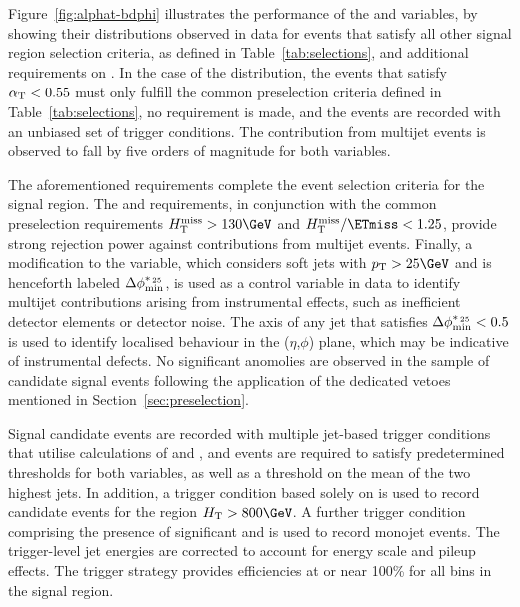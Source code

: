 Figure~\ref{fig:alphat-bdphi} illustrates the performance of the
\alphat and \bdphi variables, by showing their distributions observed
in data for events that satisfy all other signal region selection
criteria, as defined in Table~\ref{tab:selections}, and additional
requirements on \scalht. In the case of the \alphat distribution, the
events that satisfy $\alpha_{\text{T}} < 0.55$ must only fulfill the common
preselection criteria defined in Table~\ref{tab:selections}, no
\HTmiss requirement is made, and the events are recorded with an
unbiased set of trigger \scalht conditions. The contribution from
multijet events is observed to fall by five orders of magnitude for
both variables.

The aforementioned requirements complete the event selection criteria
for the signal region. The \alphat and \bdphi requirements, in
conjunction with the common preselection requirements $\HTmiss >
130\GeV$ and $\HTmiss / \ETmiss < 1.25$, provide strong rejection
power against contributions from multijet events. Finally, a
modification to the \bdphi variable, which considers soft jets with
$\Pt > 25\GeV$ and is henceforth labeled $\mbox{$\Delta\phi^{*_{\, 25}}_{\rm min}$}$, is used as a
control variable in data to identify multijet contributions arising
from instrumental effects, such as inefficient detector elements or
detector noise. The axis of any jet that satisfies $\mbox{$\Delta\phi^{*_{\, 25}}_{\rm min}$} < 0.5$
is used to identify localised behaviour in the ($\eta$,$\phi$) plane,
which may be indicative of instrumental defects. No significant
anomolies are observed in the sample of candidate signal events
following the application of the dedicated vetoes mentioned in
Section~\ref{sec:preselection}.

Signal candidate events are recorded with multiple jet-based trigger
conditions that utilise calculations of \scalht and \alphat, and
events are required to satisfy predetermined thresholds for both
variables, as well as a threshold on the mean \Pt of the two highest
\Pt jets. In addition, a trigger condition based solely on \scalht is
used to record candidate events for the region $\scalht > 800\GeV$. A
further trigger condition comprising the presence of significant
\HTmiss and \ETmiss is used to record monojet events. The
trigger-level jet energies are corrected to account for energy scale
and pileup effects. The trigger strategy provides efficiencies at or
near 100\% for all bins in the signal region. 

